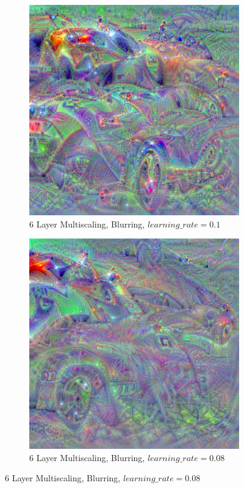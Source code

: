 \begin{figure}
    \captionsetup{justification=centering}

    \begin{subfigure}[t]{0.31\textwidth}
        \captionsetup{justification=centering}
        \centering
        \includegraphics[width=.7\linewidth]{figuras/feat_vis/experiments/classes/cl817/random_image_ci817_lr1e-1_pl6.png}
        \caption{6 Layer Multiscaling, Blurring, \(learning\_rate = 0.1\)}
    \end{subfigure}
    \hfill
    \begin{subfigure}[t]{0.31\textwidth}
        \captionsetup{justification=centering}
        \centering
        \includegraphics[width=.7\linewidth]{figuras/feat_vis/experiments/classes/cl817/random_image_ci817_lr8e-2_pl6.png}
        \caption{6 Layer Multiscaling, Blurring, \(learning\_rate = 0.08\)}

\end{subfigure}
\end{figure}
